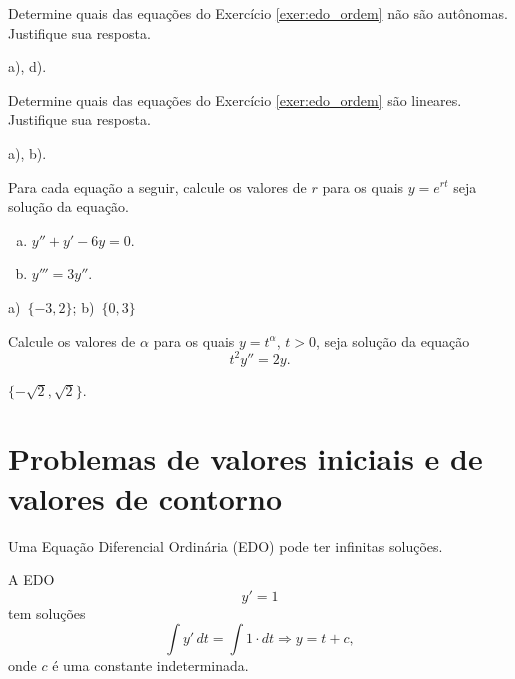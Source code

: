 \begin{exer}
  Determine quais das equações do Exercício \ref{exer:edo_ordem} não são autônomas. Justifique sua resposta.
\end{exer}
\begin{resp}
  a), d).
\end{resp}

\begin{exer}
  Determine quais das equações do Exercício \ref{exer:edo_ordem} são lineares. Justifique sua resposta.
\end{exer}
\begin{resp}
  a), b).
\end{resp}

\begin{exer}
  Para cada equação a seguir, calcule os valores de $r$ para os quais $y = e^{rt}$ seja solução da equação.
  \begin{enumerate}[a)]
  \item $y'' + y' - 6y = 0$.
  \item $y''' = 3y''$.
  \end{enumerate}
\end{exer}
\begin{resp}
  a)~$\{-3, 2\}$; b)~$\{0, 3\}$
\end{resp}

\begin{exer}
  Calcule os valores de $\alpha$ para os quais $y = t^\alpha$, $t>0$, seja solução da equação
  \begin{equation}
    t^2y'' = 2y.
  \end{equation}
\end{exer}
\begin{resp}
  $\{-\sqrt{2}, \sqrt{2}\}$.
\end{resp}


\section{Problemas de valores iniciais e de valores de contorno}\label{cap_intro_sec_pv}

Uma Equação Diferencial Ordinária (EDO) pode ter infinitas soluções.

\begin{ex}
A EDO
\begin{equation}
  y' = 1
\end{equation}
tem soluções
\begin{equation}
  \int y'\,dt = \int 1\cdot dt \Rightarrow y = t + c,
\end{equation}
onde $c$ é uma constante indeterminada.
\end{ex}

